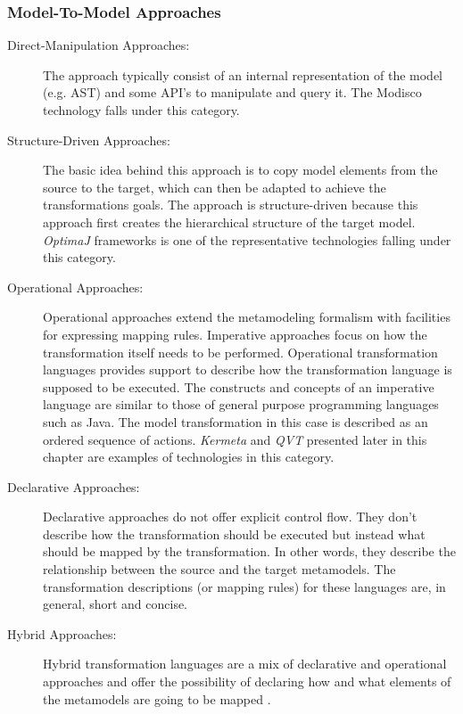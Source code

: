 \subsubsection{Model-To-Model Approaches}
\begin{description}

\item[Direct-Manipulation Approaches:] The approach typically consist of an internal representation of the model (e.g. AST) and some API's to manipulate and query it. The Modisco \cite{ModiscoMain} technology falls under this category.

\item[Structure-Driven Approaches:]
The basic idea behind this approach is to copy model elements from the source to the target, which can  then be adapted to achieve the transformations goals. The approach is structure-driven because this approach first creates the hierarchical structure of the target model. \textit{OptimaJ} frameworks is one of the representative technologies falling under this category.

\item[Operational Approaches:]
Operational approaches extend the metamodeling formalism with facilities for expressing mapping rules. 
Imperative approaches focus on how the transformation itself needs to be performed. Operational transformation languages provides support to describe how the transformation language is supposed to be executed. The constructs and concepts of an imperative language are similar to those of general purpose programming languages such as Java. The model transformation in this case is described as an ordered sequence of actions. \textit{Kermeta} and \textit{QVT} presented later in this chapter are examples of technologies in this category.

\item[Declarative Approaches:]
Declarative approaches do not offer explicit control flow. They don't describe how the transformation should be executed but instead what should be mapped by the transformation. In other words, they describe the relationship between the source and the target metamodels. The transformation descriptions (or mapping rules) for these languages are, in general, short and concise. 

\item[Hybrid Approaches:]
Hybrid transformation languages are a mix of declarative and operational approaches and offer the possibility of declaring how and what elements of the metamodels are going to be mapped \cite{HybridModelTransform}.


\end{description}
